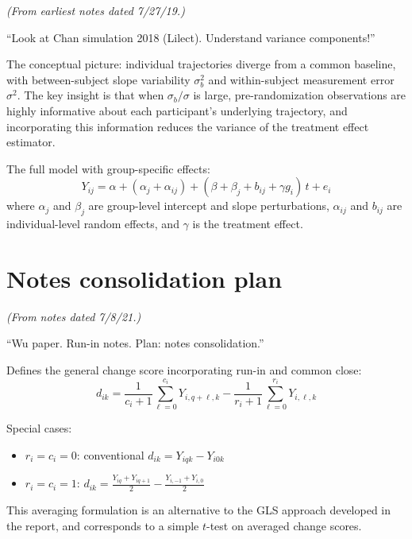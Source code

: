 \documentclass[11pt]{article}
\begin{document}
\noindent
\textit{(From earliest notes dated 7/27/19.)}

\medskip
\noindent
``Look at Chan simulation 2018 (Lilect). Understand
variance components!''

The conceptual picture: individual trajectories diverge
from a common baseline, with between-subject slope
variability $\sigma_b^2$ and within-subject measurement
error $\sigma^2$. The key insight is that when
$\sigma_b / \sigma$ is large, pre-randomization
observations are highly informative about each
participant's underlying trajectory, and incorporating
this information reduces the variance of the treatment
effect estimator.

The full model with group-specific effects:
\begin{equation}
  Y_{ij} = \alpha + (\alpha_j + \alpha_{ij})
    + (\beta + \beta_j + b_{ij} + \gamma g_i)\,t
    + e_i
\end{equation}
where $\alpha_j$ and $\beta_j$ are group-level intercept
and slope perturbations, $\alpha_{ij}$ and $b_{ij}$ are
individual-level random effects, and $\gamma$ is the
treatment effect.


\section{Notes consolidation plan}
\label{sec:consolidation}

\noindent
\textit{(From notes dated 7/8/21.)}

\medskip
\noindent
``Wu paper. Run-in notes. Plan: notes consolidation.''

Defines the general change score incorporating run-in
and common close:
\begin{equation}
  d_{ik} = \frac{1}{c_i + 1}
    \sum_{\ell=0}^{c_i} Y_{i,q+\ell,k}
  - \frac{1}{r_i + 1}
    \sum_{\ell=0}^{r_i} Y_{i,\ell,k}
\end{equation}

Special cases:
\begin{itemize}
  \item $r_i = c_i = 0$: conventional
    $d_{ik} = Y_{iqk} - Y_{i0k}$

  \item $r_i = c_i = 1$:
    $d_{ik} = \frac{Y_{iq} + Y_{iq+1}}{2}
      - \frac{Y_{i,-1} + Y_{i,0}}{2}$
\end{itemize}

This averaging formulation is an alternative to the
GLS approach developed in the report, and corresponds
to a simple $t$-test on averaged change scores.
\end{document}
